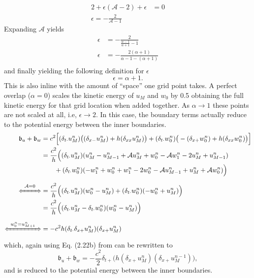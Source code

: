 \documentclass[dvipsnames]{article}
\def\mystrut{\rule[-.2\baselineskip]{0pt}{\baselineskip}}
\def\Iterm{\mathcal{A}}
\begin{document}
\begin{align*}
    2 + \epsilon(\Iterm-2) + \epsilon &= 0\\
    \epsilon = - \frac{2}{\Iterm - 1}
\end{align*}
Expanding $\Iterm$ yields
\begin{align*}
    \epsilon &= -\frac{2}{\frac{\alpha - 1}{\alpha + 1} - 1}\\
    \epsilon &= -\frac{2(\alpha + 1)}{\alpha - 1 - (\alpha + 1)}\\
\end{align*}
and finally yielding the following definition for $\epsilon$
\begin{equation}
    \epsilon = \alpha + 1.
\end{equation}
This is also inline with the amount of ``space'' one grid point takes. A perfect overlap ($\alpha = 0$) scales the kinetic energy of $u_M$ and $w_0$ by 0.5 obtaining the full kinetic energy for that grid location when added together. As $\alpha \rightarrow 1$ these points are not scaled at all, i.e, $\epsilon \rightarrow 2$. In this case, the boundary terms actually reduce to the potential energy between the inner boundaries. 
\begin{align*}
    \mathfrak{b}_u + \mathfrak{b}_w &=c^2\Big[(\delta_{t\cdot}u_M^n)\big((\delta_{x-}u_M^n)+h(\delta_{xx}u_M^n)\big)+(\delta_{t\cdot}w_0^n)\big(-(\delta_{x+}w_0^n)+h(\delta_{xx}w_0^n)\big)\Big]
    \\
    &= \frac{c^2}{h}\Big((\delta_{t\cdot}u_M^n)(u_M^n - u_{M-1}^n + \Iterm u_M^n + w_0^n - \Iterm w_1^n - 2u_M^n + u_{M-1}^n) \\
    &\qquad+ (\delta_{t\cdot}w_0^n)(-w_1^n+w_0^n + w_1^n-2w_0^n-\Iterm u_{M-1}^n + u_M^n + \Iterm w_0^n)\Big)\\
    \xLeftrightarrow{\mystrut\ \Iterm = 0\ } &= \frac{c^2}{h}\Big((\delta_{t\cdot}u_M^n)(w_0^n - u_M^n )+ (\delta_{t\cdot}w_0^n)(-w_0^n+ u_M^n)\Big)\\
    &= \frac{c^2}{h}\Big((\delta_{t\cdot}u_M^n - \delta_{t\cdot}w_0^n)(w_0^n - u_M^n)\Big)\\
    \xLeftrightarrow{\mystrut\ w_0^n = u_{M+1}^n\ }&= -c^2h(\delta_{t\cdot}\delta_{x+}u_M^n)(\delta_{x+}u_M^n)
\end{align*}
which, again using Eq. (2.22b) from \cite{Bilbao2009} can be rewritten to
\begin{equation}
    \mathfrak{b}_u+\mathfrak{b}_w = -\frac{c^2}{2}\delta_{t+}\big(h(\delta_{x+}u_M^n)(\delta_{x+}u_M^{n-1})\big),  
\end{equation}
and is reduced to the potential energy between the inner boundaries. 
\end{document}
